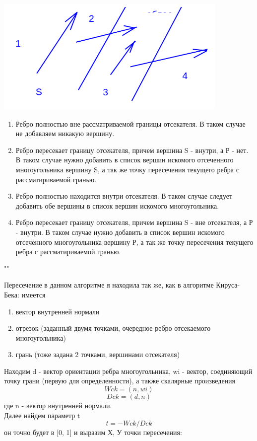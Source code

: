 \documentclass[a4paper,12pt]{article}
\begin{document}
	\includegraphics[width=\linewidth]{lines}
	
	\begin{enumerate} 
		\item Ребро полностью вне рассматриваемой границы отсекателя. В таком случае не добавляем никакую вершину.
		\item Ребро пересекает границу отсекателя, причем вершина S - внутри, а Р - нет. В таком случае нужно добавить в список вершин искомого отсеченного многоугольника вершину S, а так же точку пересечения текущего ребра с рассматириваемой гранью.
		\item Ребро полностью находится внутри отсекателя. В таком случае следует добавить обе вершины в список вершин искомого многоугольника.
		\item Ребро пересекает границу отсекателя, причем вершина S - вне отсекателя, а Р - внутри. В таком случае нужно добавить в список вершин искомого отсеченного многоугольника вершину Р, а так же точку пересечения текущего ребра с рассматириваемой гранью.
	\end{enumerate}
	""
	
	Пересечение в данном алгоритме я находила так же, как в алгоритме Кируса-Бека: имеется
	\begin{enumerate} 
		\item вектор внутренней нормали
		\item отрезок (заданный двумя точками, очередное ребро отсекаемого многоугольника)
		\item грань (тоже задана 2 точками, вершинами отсекателя)
	\end{enumerate}
	\newpage
	Находим d - вектор ориентации ребра многоугольника, wi - вектор, соединяющий точку грани (первую для определенности), а также скалярные произведения 
	\[Wck = (n, wi)\]
	\[Dck = (d, n)\]
	 где n - вектор внутренней нормали.\\
	Далее найдем параметр t \[t = -Wck / Dck\]
	он точно будет в [0, 1] и выразим Х, У точки пересечения:
	
\end{document}
